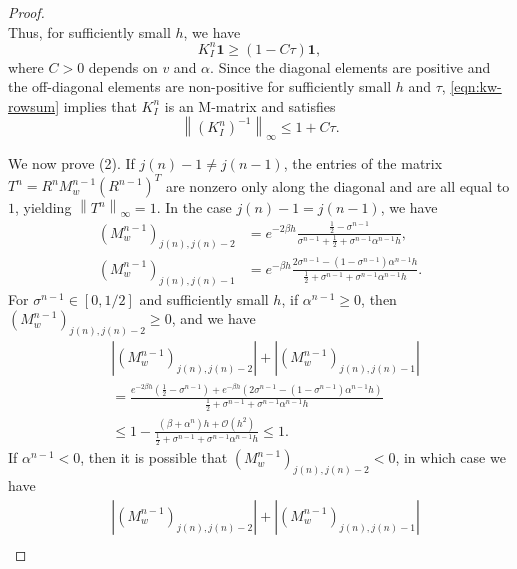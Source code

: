 \documentclass[10pt,a4paper]{amsart}
\newcommand{\abs}[1]{\left\lvert #1 \right\rvert}
\newcommand{\bm}[1]{\boldsymbol{#1}}
\newcommand{\mc}[1]{\mathcal{#1}}
\newcommand{\norm}[1]{\left\lVert #1 \right\rVert}
\newcommand{\paren}[1]{\left(#1\right)}
\begin{document}
\begin{proof}
\begin{equation}
\end{equation}
Thus, for sufficiently small $h$, we have
\begin{equation}\label{eqn:kw-rowsum}
    K_I^n\bm 1 \ge \paren{1 - C\tau}\bm 1,
\end{equation}
where $C>0$ depends on $v$ and $\alpha$.
Since the diagonal elements are positive and the off-diagonal elements are non-positive for sufficiently small $h$ and $\tau$, \eqref{eqn:kw-rowsum} implies that $K_I^n$ is an M-matrix and satisfies
\begin{equation}
    \norm{(K_I^n)^{-1}}_\infty \le 1 + C\tau.
\end{equation}





We now prove (2).
If $j(n)-1 \neq j(n-1)$, the entries of the matrix $T^n=R^n M_w^{n-1} (R^{n-1})^T$ are nonzero only along the diagonal and are all equal to $1$, yielding $\norm{T^n}_\infty=1$.
In the case $j(n)-1 = j(n-1)$, we have
\begin{align}
    \paren{M_w^{n-1}}_{j(n), j(n)-2} &= e^{-2\beta h}\frac{\frac{1}{2}-\sigma^{n-1}}{\sigma^{n-1}+\frac{1}{2}+\sigma^{n-1}\alpha^{n-1}h},\\
    \paren{M_w^{n-1}}_{j(n), j(n)-1} &= e^{-\beta h}\frac{2\sigma^{n-1} - \paren{1-\sigma^{n-1}} \alpha^{n-1} h }{ \frac{1}{2} + \sigma^{n-1} + \sigma^{n-1} \alpha^{n-1} h }.
\end{align}
For $\sigma^{n-1} \in[0,1/2]$ and sufficiently small $h$, if $\alpha^{n-1}\ge 0$, then $\paren{M_w^{n-1}}_{j(n), j(n)-2} \ge 0$, and we have
\begin{equation}\label{eqn:Mwrowjn}
\begin{aligned}
    &\abs{\paren{M_w^{n-1}}_{j(n), j(n)-2}} + \abs{\paren{M_w^{n-1}}_{j(n), j(n)-1}} \\
    &= \frac{ e^{-2\beta h}\paren{\frac{1}{2}-\sigma^{n-1}} + e^{-\beta h}\paren{ 2\sigma^{n-1} - \paren{1-\sigma^{n-1}} \alpha^{n-1} h }}{ \frac{1}{2} + \sigma^{n-1} + \sigma^{n-1} \alpha^{n-1} h } \\
    &\le 1 - \frac{\paren{\beta+\alpha^n}h + \mc O(h^2) }{ \frac{1}{2} + \sigma^{n-1} + \sigma^{n-1} \alpha^{n-1} h } \le 1.
\end{aligned}
\end{equation}
If $\alpha^{n-1}<0$, then it is possible that $\paren{M_w^{n-1}}_{j(n), j(n)-2} < 0$, in which case we have
\begin{equation}
\begin{aligned}
    &\abs{\paren{M_w^{n-1}}_{j(n), j(n)-2}} + \abs{\paren{M_w^{n-1}}_{j(n), j(n)-1}} \\

\end{aligned}
\end{equation}
\end{proof}
\end{document}
